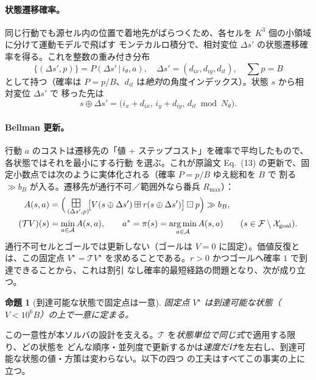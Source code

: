 \documentclass[11pt]{ltjsarticle}
\newtheorem{proposition}{命題}
\DeclareMathOperator*{\argmin}{arg\,min}
\newcommand{\wadd}{\mathbin{\boxplus}}
\newcommand{\wmul}{\mathbin{\boxdot}}
\newcommand{\bigwadd}{\mathop{\scalebox{1.45}{$\boxplus$}}}
\newcommand{\Rmax}{R_{\max}}        %
\newcommand{\Xgoal}{\mathcal{X}_{\mathrm{goal}}}
\begin{document}
\paragraph{状態遷移確率。}
同じ行動でも源セル内の位置で着地先がばらつくため、各セルを $K^3$ 個の小領域に分けて運動モデルで飛ばす
モンテカルロ積分で、相対変位 $\Delta s'$ の状態遷移確率を得る。これを整数の重み付き分布
\begin{equation}
\big\{(\Delta s',p)\big\}=P(\Delta s'\,|\,i_\theta,a),\quad \Delta s'=(d_{ix},d_{iy},d_{it}),\quad \sum p=B
\label{eq:tau}
\end{equation}
として持つ（確率は $P=p/B$、$d_{it}$ は\emph{絶対}の角度インデックス）。状態 $s$ から相対変位 $\Delta s'$ で
移った先は
\begin{equation}
s\oplus\Delta s'=\big(i_x{+}d_{ix},\,i_y{+}d_{iy},\,d_{it}\bmod N_\theta\big).
\label{eq:oplus}
\end{equation}

\paragraph{Bellman 更新。}
行動 $a$ のコストは遷移先の「値 $+$ ステップコスト」を確率で平均したもので、各状態ではそれを最小にする行動
を選ぶ。これが原論文 Eq.~(13) の更新で、固定小数点では次のように実体化される（確率 $P=p/B$ ゆえ総和を $B$ で
割る $\gg b_B$ が入る。遷移先が通行不可／範囲外なら番兵 $\Rmax$）：
\begin{align}
A(s,a)&=
\Big(\bigwadd_{(\Delta s',p)}\!\!\big[V(s\oplus\Delta s')\wadd r(s\oplus\Delta s')\big]\wmul p\Big)\gg b_B,
\label{eq:A}\\
(\mathcal{T}V)(s)&=\min_{a\in\mathcal{A}}A(s,a),\qquad
a^\ast=\pi(s)=\argmin_{a\in\mathcal{A}}A(s,a)
\qquad (s\in\mathcal{F}\setminus\Xgoal).
\label{eq:T}
\end{align}
通行不可セルとゴールでは更新しない（ゴールは $V=0$ に固定）。価値反復とは、この固定点
$V^\star=\mathcal{T}V^\star$ を求めることである。$r>0$ かつゴールへ確率 $1$ で到達できることから、これは割引
なし確率的最短経路の問題となり、次が成り立つ。

\begin{proposition}[到達可能な状態で固定点は一意]
\label{prop:unique}
固定点 $V^\star$ は到達可能な状態（$V<10^{6}B$）の上で一意に定まる。
\end{proposition}

\noindent
この一意性が本ソルバの設計を支える。$\mathcal{T}$ を\emph{状態単位で同じ式}で適用する限り、どの状態を
どんな順序・並列度で更新するかは\emph{速度だけ}を左右し、到達可能な状態の値・方策は変わらない。以下の四つ
の工夫はすべてこの事実の上に立つ。
\end{document}
